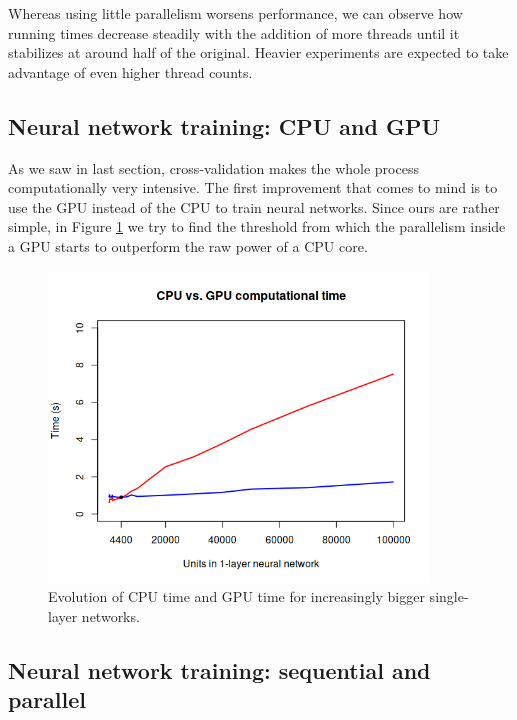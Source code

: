 		Whereas using little parallelism worsens performance, we can observe how running times decrease steadily with the addition of more threads until it stabilizes at around half of the original. Heavier experiments are expected to take advantage of even higher thread counts.
	\subsection{Neural network training: CPU and GPU}

		As we saw in last section, cross-validation makes the whole process computationally very intensive. The first improvement that comes to mind is to use the GPU instead of the CPU to train neural networks. Since ours are rather simple, in Figure \ref{gfx:nn_cpu_gpu} we try to find the threshold from which the parallelism inside a GPU starts to outperform the raw power of a CPU core.

		\begin{figure}[bth]

			\myfloatalign
			\includegraphics[width=0.9\textwidth]{gfx/CPUvsGPU.png}
			\caption[Evolution of CPU time and GPU time]{Evolution of CPU time and GPU time for increasingly bigger single-layer networks.}\label{gfx:nn_cpu_gpu}

		\end{figure}

	\subsection{Neural network training: sequential and parallel}
